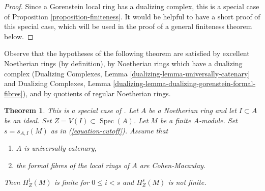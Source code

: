 \documentclass{stacks-project}
\newenvironment{reference}{\comment}{\endcomment}
\theoremstyle{plain}
\newtheorem{theorem}[subsection]{Theorem}
\theoremstyle{definition}
\theoremstyle{remark}
\numberwithin{equation}{subsection}
\def\Spec{\mathop{\mathrm{Spec}}}
\begin{document}
\begin{proof}
Since a Gorenstein local ring has a dualizing complex,
this is a special case of Proposition \ref{proposition-finiteness}.
It would be helpful to have a short proof of this special case,
which will be used in the proof of a general finiteness theorem below.
\end{proof}

\noindent
Observe that the hypotheses of the following theorem are satisfied
by excellent Noetherian rings (by definition),
by Noetherian rings which have a dualizing complex
(Dualizing Complexes, Lemma \ref{dualizing-lemma-universally-catenary} and
Dualizing Complexes, Lemma
\ref{dualizing-lemma-dualizing-gorenstein-formal-fibres}), and
by quotients of regular Noetherian rings.

\begin{theorem}
\label{theorem-finiteness}
\begin{reference}
This is a special case of \cite[Satz 2]{Faltings-finiteness}.
\end{reference}
Let $A$ be a Noetherian ring and let $I \subset A$ be an ideal.
Set $Z = V(I) \subset \Spec(A)$. Let $M$ be a finite $A$-module.
Set $s = s_{A, I}(M)$ as in (\ref{equation-cutoff}).
Assume that
\begin{enumerate}
\item $A$ is universally catenary,
\item the formal fibres of the local rings of $A$ are Cohen-Macaulay.
\end{enumerate}
Then $H^i_Z(M)$ is finite for $0 \leq i < s$ and
$H^s_Z(M)$ is not finite.
\end{theorem}
\end{document}
